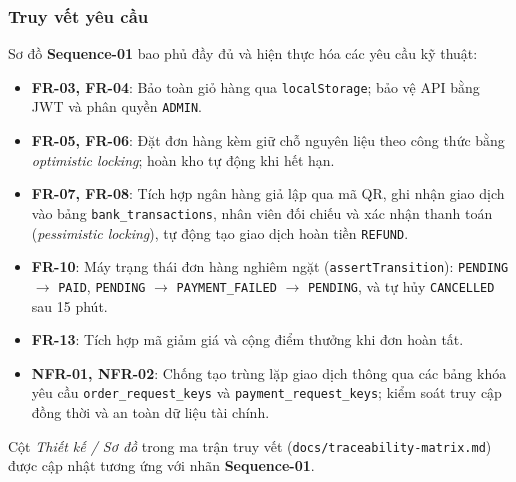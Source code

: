 \subsubsection{Truy vết yêu cầu}

Sơ đồ \textbf{Sequence-01} bao phủ đầy đủ và hiện thực hóa các yêu cầu kỹ thuật:
\begin{itemize}
  \item \textbf{FR-03, FR-04}: Bảo toàn giỏ hàng qua \texttt{localStorage}; bảo vệ API bằng JWT và phân quyền \texttt{ADMIN}.
  \item \textbf{FR-05, FR-06}: Đặt đơn hàng kèm giữ chỗ nguyên liệu theo công thức bằng \emph{optimistic locking}; hoàn kho tự động khi hết hạn.
  \item \textbf{FR-07, FR-08}: Tích hợp ngân hàng giả lập qua mã QR, ghi nhận giao dịch vào bảng \texttt{bank\_transactions}, nhân viên đối chiếu và xác nhận thanh toán (\emph{pessimistic locking}), tự động tạo giao dịch hoàn tiền \texttt{REFUND}.
  \item \textbf{FR-10}: Máy trạng thái đơn hàng nghiêm ngặt (\texttt{assertTransition}): \texttt{PENDING} $\rightarrow$ \texttt{PAID}, \texttt{PENDING} $\rightarrow$ \texttt{PAYMENT\_FAILED} $\rightarrow$ \texttt{PENDING}, và tự hủy \texttt{CANCELLED} sau 15 phút.
  \item \textbf{FR-13}: Tích hợp mã giảm giá và cộng điểm thưởng khi đơn hoàn tất.
  \item \textbf{NFR-01, NFR-02}: Chống tạo trùng lặp giao dịch thông qua các bảng khóa yêu cầu \texttt{order\_request\_keys} và \texttt{payment\_request\_keys}; kiểm soát truy cập đồng thời và an toàn dữ liệu tài chính.
\end{itemize}
Cột \emph{Thiết kế / Sơ đồ} trong ma trận truy vết (\texttt{docs/traceability-matrix.md}) được cập nhật tương ứng với nhãn \textbf{Sequence-01}.
